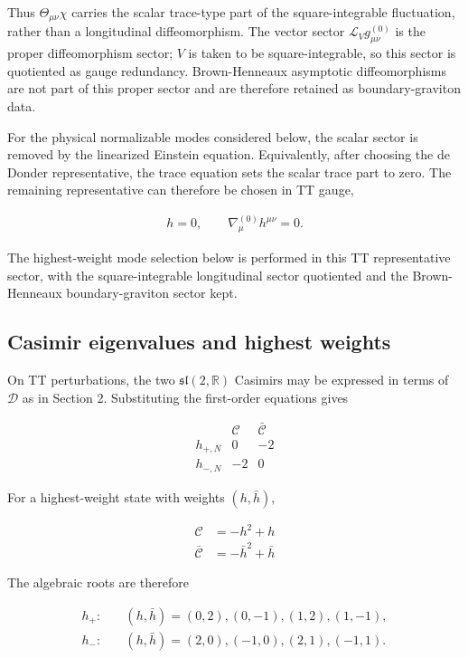Thus \(\Theta_{\mu\nu}\chi\) carries the scalar trace-type part of the square-integrable fluctuation, rather than a longitudinal diffeomorphism. The vector sector \(\mathcal{L}_{V}g^{(0)}_{\mu\nu}\) is the proper diffeomorphism sector; \(V\) is taken to be square-integrable, so this sector is quotiented as gauge redundancy. Brown-Henneaux asymptotic diffeomorphisms are not part of this proper sector and are therefore retained as boundary-graviton data.

For the physical normalizable modes considered below, the scalar sector is removed by the linearized Einstein equation. Equivalently, after choosing the de Donder representative, the trace equation sets the scalar trace part to zero. The remaining representative can therefore be chosen in TT gauge,

\begin{align}
h=0,\qquad
\nabla^{(0)}_{\mu}h^{\mu\nu}=0 .
\end{align}

The highest-weight mode selection below is performed in this TT representative sector, with the square-integrable longitudinal sector quotiented and the Brown-Henneaux boundary-graviton sector kept.

\subsection{Casimir eigenvalues and highest weights}\label{casimir-eigenvalues-and-highest-weights}

On TT perturbations, the two \(\mathfrak{sl}(2,\mathbb{R})\) Casimirs may be expressed in terms of \(\mathcal{D}\) as in Section 2. Substituting the first-order equations gives

\[\begin{array}{c|cc}
&\mathcal{C}&\bar{\mathcal{C}}\\
\hline
h_{+,N}&0&-2\\
h_{-,N}&-2&0
\end{array}\]

For a highest-weight state with weights \((h,\bar h)\),

\begin{align}
\mathcal{C} & =-h^{2}+h \\
\mathcal{\bar{C}} & =-\bar{h}^{2}+\bar{h}
\end{align}

The algebraic roots are therefore

\begin{align}
h_{+}:&\quad (h,\bar h)=(0,2),(0,-1),(1,2),(1,-1),\\
h_{-}:&\quad (h,\bar h)=(2,0),(-1,0),(2,1),(-1,1).
\end{align}

